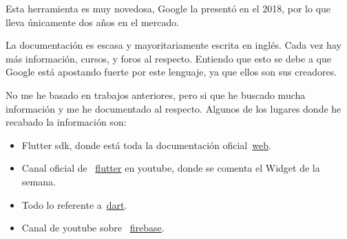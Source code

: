 
Esta herramienta es muy novedosa, Google la presentó en el 2018, por lo que lleva únicamente dos años en el mercado.

La documentación es escasa y mayoritariamente escrita en inglés. Cada vez hay más información, cursos, y foros al respecto. Entiendo que esto se debe a que Google está apostando fuerte por este lenguaje, ya que ellos son sus creadores.

No me he basado en trabajos anteriores, pero si que he buscado mucha información y me he documentado al respecto. Algunos de los lugares donde he recabado la información son:


\begin{itemize}
	\item Flutter sdk, donde está toda la documentación oficial~\href{https://flutter.dev/}{web}.
	\item Canal oficial de  ~\href{https://www.youtube.com/watch?v=ukLBCRBlIkk&list=PLjxrf2q8roU1kMpfyJ4EY0pID2oRHtvGm}{flutter} en youtube, donde se comenta el Widget de la semana.
	\item Todo lo referente a~\href{https://api.dart.dev/stable/2.8.4/index.html}{dart}.
	\item Canal de youtube sobre ~\href{https://www.youtube.com/channel/UCP4bf6IHJJQehibu6ai__cg}{firebase}.
\end{itemize}